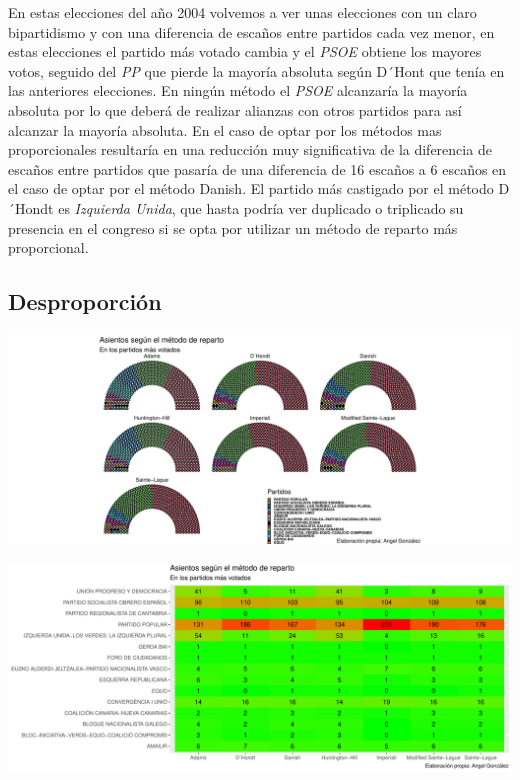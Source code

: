 \documentclass[12pt,a4paper,]{book}
\numberwithin{dummy}{section}
\theoremstyle{ocrenumbox}
\theoremstyle{blacknumex}
\theoremstyle{blacknumbox}
\theoremstyle{ocrenum}
\theoremstyle{ocrenum}
\begin{document}
En estas elecciones del año 2004 volvemos a ver unas elecciones con un
claro bipartidismo y con una diferencia de escaños entre partidos cada
vez menor, en estas elecciones el partido más votado cambia y el
\emph{PSOE} obtiene los mayores votos, seguido del \emph{PP} que pierde
la mayoría absoluta según D´Hont que tenía en las anteriores elecciones.
En ningún método el \emph{PSOE} alcanzaría la mayoría absoluta por lo
que deberá de realizar alianzas con otros partidos para así alcanzar la
mayoría absoluta. En el caso de optar por los métodos mas proporcionales
resultaría en una reducción muy significativa de la diferencia de
escaños entre partidos que pasaría de una diferencia de 16 escaños a 6
escaños en el caso de optar por el método Danish. El partido más
castigado por el método D´Hondt es \emph{Izquierda Unida}, que hasta
podría ver duplicado o triplicado su presencia en el congreso si se opta
por utilizar un método de reparto más proporcional.

\hypertarget{desproporciuxf3n-8}{%
\subsection{Desproporción}\label{desproporciuxf3n-8}}

\begin{center}\includegraphics[width=1\linewidth]{figurasR/unnamed-chunk-101-1} \end{center}

\begin{center}\includegraphics[width=1\linewidth]{figurasR/unnamed-chunk-101-2} \end{center}
\end{document}
